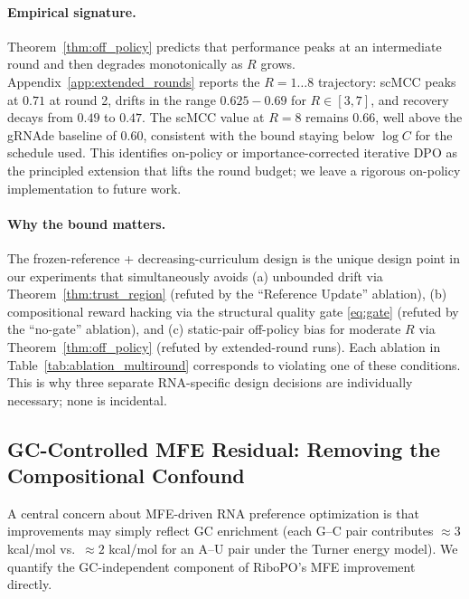 {{\paragraph{Empirical signature.}
Theorem~\ref{thm:off_policy} predicts that performance peaks at an intermediate round and then degrades monotonically as $R$ grows. Appendix~\ref{app:extended_rounds} reports the $R{=}1{\dots}8$ trajectory: scMCC peaks at $0.71$ at round 2, drifts in the range $0.625{-}0.69$ for $R\in[3,7]$, and recovery decays from $0.49$ to $0.47$. The scMCC value at $R{=}8$ remains $0.66$, well above the gRNAde baseline of $0.60$, consistent with the bound staying below $\log C$ for the schedule used. This identifies on-policy or importance-corrected iterative DPO as the principled extension that lifts the round budget; we leave a rigorous on-policy implementation to future work.

\paragraph{Why the bound matters.}
The frozen-reference + decreasing-curriculum design is the unique design point in our experiments that simultaneously avoids (a) unbounded drift via Theorem~\ref{thm:trust_region} (refuted by the ``Reference Update'' ablation), (b) compositional reward hacking via the structural quality gate \eqref{eq:gate} (refuted by the ``no-gate'' ablation), and (c) static-pair off-policy bias for moderate $R$ via Theorem~\ref{thm:off_policy} (refuted by extended-round runs). Each ablation in Table~\ref{tab:ablation_multiround} corresponds to violating one of these conditions. This is why three separate RNA-specific design decisions are individually necessary; none is incidental.


\subsection{GC-Controlled MFE Residual: Removing the Compositional Confound}
\label{subsec:gc_control}

A central concern about MFE-driven RNA preference optimization is that improvements may simply reflect GC enrichment (each G--C pair contributes $\approx 3$ kcal/mol vs.\ $\approx 2$ kcal/mol for an A--U pair under the Turner energy model). We quantify the GC-independent component of RiboPO's MFE improvement directly.

}}

